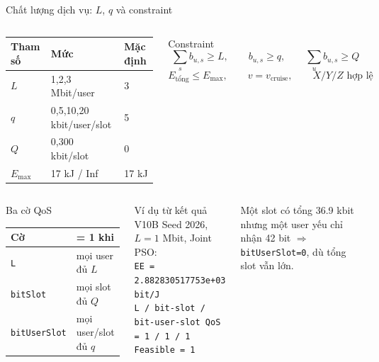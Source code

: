 \documentclass[t,aspectratio=169]{beamer}
\begin{document}
\begin{frame}{Chất lượng dịch vụ: $L$, $q$ và constraint}
  \begin{columns}[T]
  \scriptsize
  \setlength{\tabcolsep}{3pt}
  \begin{tabular}{@{}l l l@{}}
    \toprule
    \textbf{Tham số} & \textbf{Mức} & \textbf{Mặc định}\\
    \midrule
    \(L\) & 1,2,3 Mbit/user & 3\\
    \(q\) & 0,5,10,20 kbit/user/slot & 5\\
    \(Q\) & 0,300 kbit/slot & 0\\
    \(E_{\max}\) & 17 kJ / Inf & 17 kJ\\
    \bottomrule
  \end{tabular}
  \begin{block}{Constraint}\scriptsize
  \[
  \sum_s b_{u,s}\ge L,\qquad b_{u,s}\ge q,\qquad \sum_u b_{u,s}\ge Q
  \]
  \[
  E_{\text{tổng}}\le E_{\max},\qquad v=v_{\text{cruise}},\qquad X/Y/Z\text{ hợp lệ}
  \]
  \end{block}
  \end{columns}
  \vspace{-2pt}
  \begin{columns}[T]
  \begin{block}{Ba cờ QoS}\scriptsize
  \renewcommand{\arraystretch}{0.95}
  \begin{tabular}{@{}l l@{}}
    \toprule
    \textbf{Cờ} & \textbf{= 1 khi}\\
    \midrule
    \texttt{L} & mọi user đủ \(L\)\\
    \texttt{bitSlot} & mọi slot đủ \(Q\)\\
    \texttt{bitUserSlot} & mọi user/slot đủ \(q\)\\
    \bottomrule
  \end{tabular}
  \end{block}
  \begin{block}{Ví dụ từ kết quả V10B}\tiny
  Seed 2026, \(L=1\) Mbit, Joint PSO:\\
  \texttt{EE = 2.882830517753e+03 bit/J}\\
  \texttt{L / bit-slot / bit-user-slot QoS = 1 / 1 / 1}\\
  \texttt{Feasible = 1}
  \end{block}
  \vspace{2pt}
  {\tiny Một slot có tổng 36.9 kbit nhưng một user yếu chỉ nhận 42 bit \(\Rightarrow\) \texttt{bitUserSlot=0}, dù tổng slot vẫn lớn.}
  \end{columns}
\end{frame}
\end{document}
